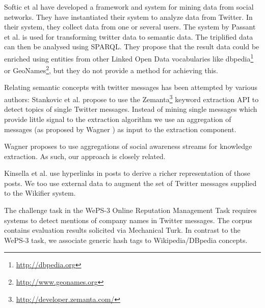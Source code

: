 \documentclass{llncs}
\begin{document}
Softic et al \cite{key:softic} have developed a framework and system for mining data from social networks. They have instantiated their system to analyze data from Twitter. In their system, they collect data from one or several users. The system by Passant et al. \cite{key:smob} is used for transforming twitter data to semantic data. The triplified data can then be analysed using SPARQL. They propose that the result data could be enriched using entities from other Linked Open Data vocabularies like dbpedia\footnote{\url{http://dbpedia.org}} or GeoNames\footnote{\url{http://www.geonames.org}}, but they do not provide a method for achieving this.

Relating semantic concepts with twitter messages has been attempted by various authors:
Stankovic et al. \cite{key:stanko} propose to use the Zemanta\footnote{\url{http://developer.zemanta.com/}} keyword extraction API to detect topics of single Twitter messages. 
Instead of mining single messages which provide little signal to the extraction algorithm we use an aggregation of messages (as proposed by Wagner \cite{key:clauwa}) as input to the extraction component.

Wagner \cite{key:clauwa} proposes to use aggregations of social awareness streams for knowledge extraction. As such, our approach is closely related.

Kinsella et al. \cite{key:kinsella} use hyperlinks in posts to derive a richer representation of those posts. We too use external data to augment the set of Twitter messages supplied to the Wikifier system.

The challenge task in the WePS-3 Online Reputation Management Task\cite{key:clef} requires systems to detect mentions of company names in Twitter messages.
The corpus contains evaluation results solicited via Mechanical Turk. In contrast to the WePS-3 task, we associate generic hash tags to Wikipedia/DBpedia concepts.
\end{document}
